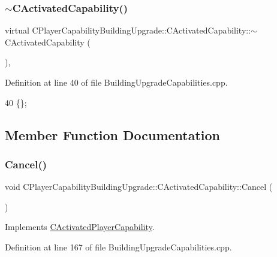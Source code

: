 \subsubsection{\texorpdfstring{$\sim$\+C\+Activated\+Capability()}{~CActivatedCapability()}}
{\footnotesize\ttfamily virtual C\+Player\+Capability\+Building\+Upgrade\+::\+C\+Activated\+Capability\+::$\sim$\+C\+Activated\+Capability (\begin{DoxyParamCaption}{ }\end{DoxyParamCaption})\hspace{0.3cm}{\ttfamily [inline]}, {\ttfamily [virtual]}}



Definition at line 40 of file Building\+Upgrade\+Capabilities.\+cpp.


\begin{DoxyCode}
40 \{\};
\end{DoxyCode}


\subsection{Member Function Documentation}
\hypertarget{classCPlayerCapabilityBuildingUpgrade_1_1CActivatedCapability_adca97e7f7611f4adfcfea615428dac0b}{}\label{classCPlayerCapabilityBuildingUpgrade_1_1CActivatedCapability_adca97e7f7611f4adfcfea615428dac0b} 
\subsubsection{\texorpdfstring{Cancel()}{Cancel()}}
{\footnotesize\ttfamily void C\+Player\+Capability\+Building\+Upgrade\+::\+C\+Activated\+Capability\+::\+Cancel (\begin{DoxyParamCaption}{ }\end{DoxyParamCaption})\hspace{0.3cm}{\ttfamily [virtual]}}



Implements \hyperlink{classCActivatedPlayerCapability_a5cde83be468e262ad054d81e28684a81}{C\+Activated\+Player\+Capability}.



Definition at line 167 of file Building\+Upgrade\+Capabilities.\+cpp.



